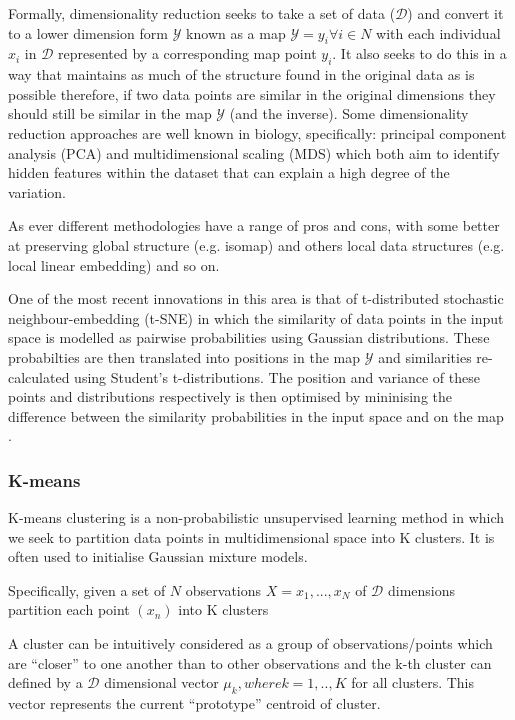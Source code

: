 Formally, dimensionality reduction seeks to take a set of data (\(\mathcal{D}\)) and convert it
to a lower dimension form \(\mathcal{Y}\) known as a map \(\mathcal{Y} = {y_{i} \forall i \in N}\) 
with each individual \(x_{i}\) in \(\mathcal{D}\) represented by a corresponding map point \(y_{i}\). It
also seeks to do this in a way that maintains as much of the structure found in the original data 
as is possible \citep{Maaten2008} therefore, if two data points are similar in the original dimensions
they should still be similar in the map \(\mathcal{Y}\) (and the inverse).
Some dimensionality reduction approaches are well known in biology, specifically: principal component analysis (PCA) 
\citep{hotelling1933analysis} and multidimensional scaling (MDS) \citep{Torgerson1952} which both aim to identify
hidden features within the dataset that can explain a high degree of the variation.  


As ever different methodologies have a range of pros and cons, with
some better at preserving global structure (e.g. isomap) and others local data structures (e.g. local linear embedding) and so on.

One of the most recent innovations in this area is that of t-distributed stochastic neighbour-embedding
(t-SNE) in which the similarity of data points in the input space is modelled as pairwise probabilities 
using Gaussian distributions.
These probabilties are then translated into positions in the map \(\mathcal{Y}\) and similarities re-calculated
using Student's t-distributions.  The position and variance of these points and distributions respectively
is then optimised by mininising the difference between the similarity probabilities in the input space
and on the map \citep{Maaten2008}.

\subsubsection{K-means}

K-means clustering is a non-probabilistic unsupervised learning 
method in which we seek to partition data points in multidimensional space into 
K clusters. It is often used to initialise Gaussian mixture models.

Specifically, given a set of \(N\) observations \(X = {x_{1},...,x_{N}}\) 
of \(\mathcal{D}\) dimensions partition each point \((x_{n})\) into K clusters

A cluster can be intuitively considered as a group of observations/points which are 
``closer'' to one another than to other observations and the k-th cluster can 
defined by a \(\mathcal{D}\) dimensional vector \(\mu_{k}, where k=1,..,K\) for all clusters.
This vector represents the current ``prototype'' centroid of cluster. 

